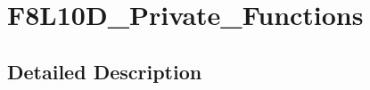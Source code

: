\hypertarget{group___f8_l10_d___private___functions}{}\section{F8\+L10\+D\+\_\+\+Private\+\_\+\+Functions}
\label{group___f8_l10_d___private___functions}


\subsection{Detailed Description}
